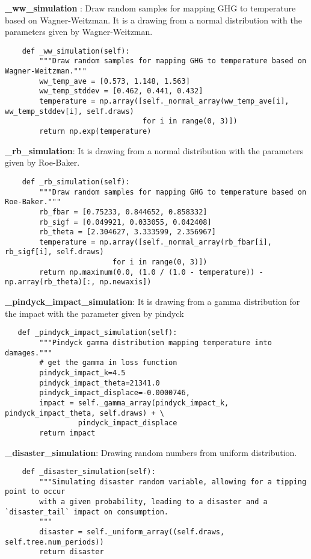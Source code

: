 \documentclass[12pt]{article}
\begin{document}
\textbf{\_ww\_simulation} : Draw random samples for mapping GHG to temperature based on Wagner-Weitzman. It is a drawing from a normal distribution with the parameters given by Wagner-Weitzman.
\begin{verbatim}
    def _ww_simulation(self):
        """Draw random samples for mapping GHG to temperature based on Wagner-Weitzman."""
        ww_temp_ave = [0.573, 1.148, 1.563]
        ww_temp_stddev = [0.462, 0.441, 0.432]
        temperature = np.array([self._normal_array(ww_temp_ave[i], ww_temp_stddev[i], self.draws)
                                for i in range(0, 3)])
        return np.exp(temperature)
\end{verbatim}


\textbf{\_rb\_simulation}: It is drawing from a normal distribution with the parameters given by Roe-Baker.
\begin{verbatim}
    def _rb_simulation(self):
        """Draw random samples for mapping GHG to temperature based on Roe-Baker."""
        rb_fbar = [0.75233, 0.844652, 0.858332]
        rb_sigf = [0.049921, 0.033055, 0.042408]
        rb_theta = [2.304627, 3.333599, 2.356967]
        temperature = np.array([self._normal_array(rb_fbar[i], rb_sigf[i], self.draws)
                         for i in range(0, 3)])
        return np.maximum(0.0, (1.0 / (1.0 - temperature)) - np.array(rb_theta)[:, np.newaxis])
\end{verbatim}

\textbf{\_pindyck\_impact\_simulation}: It is drawing from a gamma distribution for the impact with the parameter given by pindyck
\begin{verbatim}
   def _pindyck_impact_simulation(self):
        """Pindyck gamma distribution mapping temperature into damages."""
        # get the gamma in loss function
        pindyck_impact_k=4.5
        pindyck_impact_theta=21341.0
        pindyck_impact_displace=-0.0000746,
        impact = self._gamma_array(pindyck_impact_k, pindyck_impact_theta, self.draws) + \
                 pindyck_impact_displace
        return impact
\end{verbatim}

\textbf{\_disaster\_simulation}: Drawing random numbers from uniform distribution.
\begin{verbatim}
    def _disaster_simulation(self):
        """Simulating disaster random variable, allowing for a tipping point to occur
        with a given probability, leading to a disaster and a `disaster_tail` impact on consumption.
        """
        disaster = self._uniform_array((self.draws, self.tree.num_periods))
        return disaster
\end{verbatim}
\end{document}
